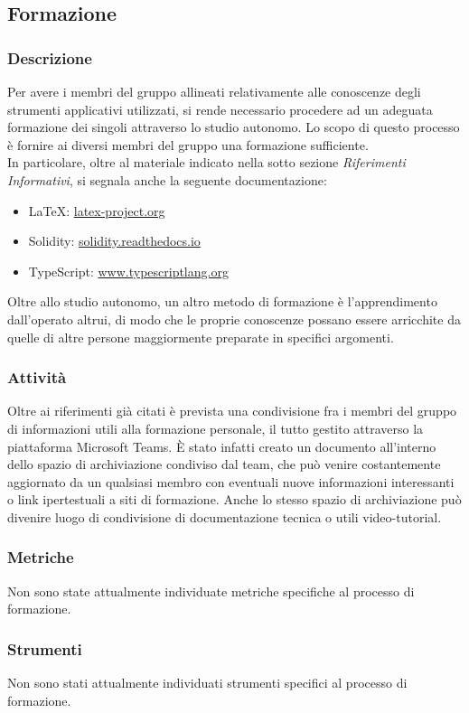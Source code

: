 \subsection{Formazione}
		\subsubsection{Descrizione}	
		Per avere i membri del gruppo \Gruppo{} allineati relativamente alle conoscenze degli strumenti applicativi utilizzati, si rende necessario procedere ad un adeguata formazione dei singoli attraverso lo studio autonomo. Lo scopo di questo processo è fornire ai diversi membri del gruppo una formazione sufficiente.\\
		In particolare, oltre al materiale indicato nella sotto sezione \textit{Riferimenti Informativi}, si segnala anche la seguente documentazione:
		\begin{itemize}
			\item \LaTeX{}: \href{latex-project.org}{latex-project.org}
			\item Solidity: \href{solidity.readthedocs.io}{solidity.readthedocs.io}
			\item TypeScript: \href{www.typescriptlang.org}{www.typescriptlang.org}
		\end{itemize}
		Oltre allo studio autonomo, un altro metodo di formazione è l'apprendimento dall'operato altrui, di modo che le proprie conoscenze possano essere arricchite da quelle di altre persone maggiormente preparate in specifici argomenti.
		
		\subsubsection{Attività}	
			Oltre ai riferimenti già citati è prevista una condivisione fra i membri del gruppo di informazioni utili alla formazione personale, il tutto gestito attraverso la piattaforma Microsoft Teams. È stato infatti creato un documento all'interno dello spazio di archiviazione condiviso dal team, che può venire costantemente aggiornato da un qualsiasi membro con eventuali nuove informazioni interessanti o link ipertestuali a siti di formazione. Anche lo stesso spazio di archiviazione può divenire luogo di condivisione di documentazione tecnica o utili video-tutorial.
		\subsubsection{Metriche}
		Non sono state attualmente individuate metriche specifiche al processo di formazione.
		\subsubsection{Strumenti}
		Non sono stati attualmente individuati strumenti specifici al processo di formazione.
